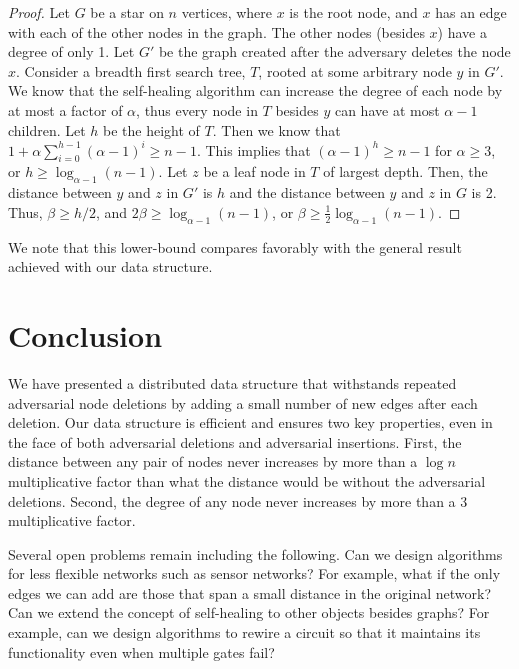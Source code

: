 \documentclass[11pt, letter]{article}
\begin{document}
\begin{proof}
Let $G$ be a star on $n$ vertices, where $x$ is the root node, and $x$ has an edge with each of the
other nodes in the graph. The other nodes (besides $x$) have a degree of only 1. Let $G'$ be the graph created after the
adversary deletes the node $x$.  Consider a breadth
first search tree, $T$, rooted at some arbitrary node $y$ in $G'$.  We know that the self-healing algorithm can increase
the degree of each node by at most a factor of $\alpha$, thus every node in $T$ besides $y$ can have at most $\alpha-1$
children. 
Let $h$ be the height of $T$.  Then we know that $1 + \alpha \sum_{i=0}^{h-1}
(\alpha-1)^{i} \geq n-1$.  This implies that  $(\alpha-1)^{h} \geq n-1$ for $\alpha \geq 3$, or ${h} \geq
\log_{\alpha-1}(n-1)$.  Let $z$ be a leaf node in $T$ of largest depth. Then, the distance between $y$ and $z$ in $G'$ is $h$ and the distance 
between $y$ and $z$ in $G$ is 2. Thus, $\beta \ge h/2$, and  $2\beta 
\geq \log_{\alpha-1} (n-1)$, or $\beta \geq \frac{1}{2}\log_{\alpha-1}( n-1)$. 
\end{proof}
\noindent
We note that this lower-bound compares favorably with the general
result achieved with our data structure.  


\section{Conclusion}
We have presented a distributed data structure that withstands
repeated adversarial node deletions by adding a small number of new
edges after each deletion.  Our data structure is efficient and ensures two key
properties, even in the face of both adversarial deletions and adversarial insertions.
First, the distance between any pair of nodes never increases by more than a $\log n$ multiplicative factor than what the distance would be without the adversarial deletions.  Second, the degree of any node never increases by more than a $3$ multiplicative factor.

Several open problems remain including the following. Can we design algorithms
for less flexible networks such as sensor networks?  For example, what
if the only edges we can add are those that span a small distance in
the original network?  Can we extend the concept of
self-healing to other objects besides graphs?  For example, can we
design algorithms to rewire a circuit so that it maintains its
functionality even when multiple gates fail?

\pagebreak
\newpage
 

\end{document}

